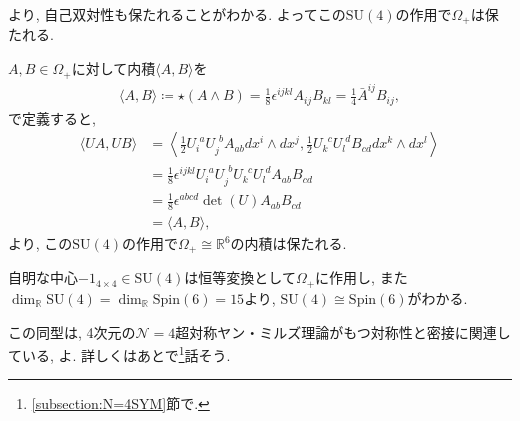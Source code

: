 \documentclass{ltjsarticle}
\theoremstyle{definition}
\begin{document}
より, 自己双対性も保たれることがわかる. よってこの$\mathrm{SU}(4)$の作用で$\Omega_+$は保たれる.\par
$A,B\in\Omega_+$に対して内積$\langle A,B\rangle$を
\begin{align}
\langle A,B\rangle\coloneqq\star\left(A\wedge B\right)=\frac18\epsilon^{ijkl}A_{ij}B_{kl}=\frac14\bar A^{ij}B_{ij},
\end{align}
で定義すると, 
\begin{align}
\langle UA,UB\rangle&=\left\langle\frac12U_i^{\phantom{i}a}U_j^{\phantom{j}b}A_{ab}dx^i\wedge dx^j,\frac12U_k^{\phantom{k}c}U_l^{\phantom{l}d}B_{cd}dx^k\wedge dx^l\right\rangle\\
&=\frac18\epsilon^{ijkl}U_i^{\phantom{i}a}U_j^{\phantom{j}b}U_k^{\phantom{k}c}U_l^{\phantom{l}d}A_{ab}B_{cd}\\
&=\frac18\epsilon^{abcd}\det(U)A_{ab}B_{cd}\\&=\langle A,B\rangle,
\end{align}
より, この$\mathrm{SU}(4)$の作用で$\Omega_+\cong\mathbb R^6$の内積は保たれる. \par
自明な中心$-1_{4\times4}\in\mathrm{SU}(4)$は恒等変換として$\Omega_+$に作用し, また$\dim_{\mathbb{R}}\mathrm{SU}(4)=\dim_{\mathbb R}\mathrm{Spin}(6)=15$より, $\mathrm{SU}(4)\cong\mathrm{Spin}(6)$がわかる.\par
この同型は, 4次元の$\mathcal N=4$超対称ヤン・ミルズ理論がもつ対称性と密接に関連している, よ. 詳しくはあとで\footnote{\ref{subsection:N=4SYM}節で.}話そう.
\end{document}

